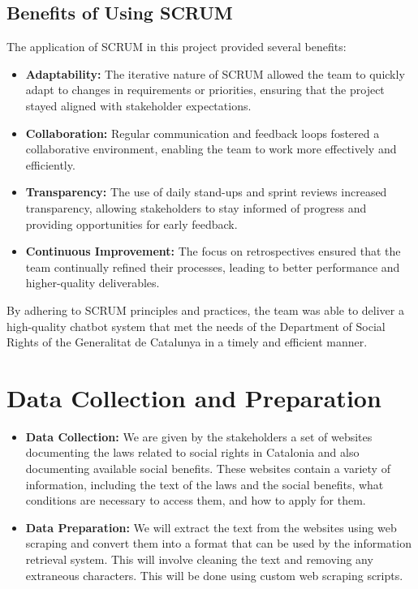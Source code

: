 \documentclass[a4paper,12pt,twoside]{ThesisStyle}
\begin{document}
\subsection{Benefits of Using SCRUM}

The application of SCRUM in this project provided several benefits:
\begin{itemize}
    \item \textbf{Adaptability:} The iterative nature of SCRUM allowed the team to quickly adapt to changes in requirements or priorities, ensuring that the project stayed aligned with stakeholder expectations.
    \item \textbf{Collaboration:} Regular communication and feedback loops fostered a collaborative environment, enabling the team to work more effectively and efficiently.
    \item \textbf{Transparency:} The use of daily stand-ups and sprint reviews increased transparency, allowing stakeholders to stay informed of progress and providing opportunities for early feedback.
    \item \textbf{Continuous Improvement:} The focus on retrospectives ensured that the team continually refined their processes, leading to better performance and higher-quality deliverables.
\end{itemize}

By adhering to SCRUM principles and practices, the team was able to deliver a high-quality chatbot system that met the needs of the Department of Social Rights of the Generalitat de Catalunya in a timely and efficient manner.

\section{Data Collection and Preparation}
\label{sec:data}

\begin{itemize}
  \item \textbf{Data Collection:} We are given by the stakeholders a set of websites documenting the laws related to social rights in Catalonia and also documenting available social benefits. These websites contain a variety of information, including the text of the laws and the social benefits, what conditions are necessary to access them, and how to apply for them.
  \item \textbf{Data Preparation:} We will extract the text from the websites using web scraping and convert them into a format that can be used by the information retrieval system. This will involve cleaning the text and removing any extraneous characters. This will be done using custom web scraping scripts.
\end{itemize}
\end{document}
